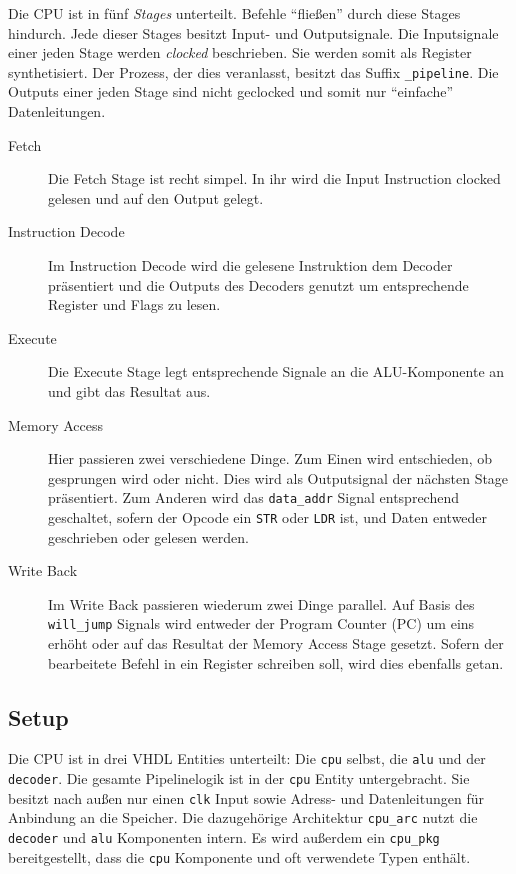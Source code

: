 \documentclass[paper=a4,fontsize=12pt,twocolumn]{scrreprt}
\begin{document}

Die CPU ist in fünf \textit{Stages} unterteilt.
Befehle \enquote{fließen} durch diese Stages hindurch.
Jede dieser Stages besitzt Input- und Outputsignale.
Die Inputsignale einer jeden Stage werden \textit{clocked} beschrieben.
Sie werden somit als Register synthetisiert.
Der Prozess, der dies veranlasst, besitzt das Suffix \texttt{\_pipeline}.
Die Outputs einer jeden Stage sind nicht geclocked und somit nur \enquote{einfache} Datenleitungen.

\begin{description}
  \item[Fetch]
  Die Fetch Stage ist recht simpel.
  In ihr wird die Input Instruction clocked gelesen und auf den Output gelegt.
  \item[Instruction Decode]
  Im Instruction Decode wird die gelesene Instruktion dem Decoder präsentiert und die Outputs des Decoders genutzt um entsprechende Register und Flags zu lesen.
  \item[Execute]
  Die Execute Stage legt entsprechende Signale an die ALU-Komponente an und gibt das Resultat aus.
  \item[Memory Access]
  Hier passieren zwei verschiedene Dinge.
  Zum Einen wird entschieden, ob gesprungen wird oder nicht.
  Dies wird als Outputsignal der nächsten Stage präsentiert.
  Zum Anderen wird das \texttt{data\_addr} Signal entsprechend geschaltet, sofern der Opcode ein \texttt{STR} oder \texttt{LDR} ist, und Daten entweder geschrieben oder gelesen werden.
  \item[Write Back]
  Im Write Back passieren wiederum zwei Dinge parallel.
  Auf Basis des \texttt{will\_jump} Signals wird entweder der Program Counter (PC) um eins erhöht oder auf das Resultat der Memory Access Stage gesetzt.
  Sofern der bearbeitete Befehl in ein Register schreiben soll, wird dies ebenfalls getan.
\end{description}

\subsection{Setup}

Die CPU ist in drei VHDL Entities unterteilt: Die \texttt{cpu} selbst, die \texttt{alu} und der \texttt{decoder}.
Die gesamte Pipelinelogik ist in der \texttt{cpu} Entity untergebracht.
Sie besitzt nach außen nur einen \texttt{clk} Input sowie Adress- und Datenleitungen für Anbindung an die Speicher\footnotemark.
Die dazugehörige Architektur \texttt{cpu\_arc} nutzt die \texttt{decoder} und \texttt{alu} Komponenten intern.
Es wird außerdem ein \texttt{cpu\_pkg} bereitgestellt, dass die \texttt{cpu} Komponente und oft verwendete Typen enthält.
\end{document}

